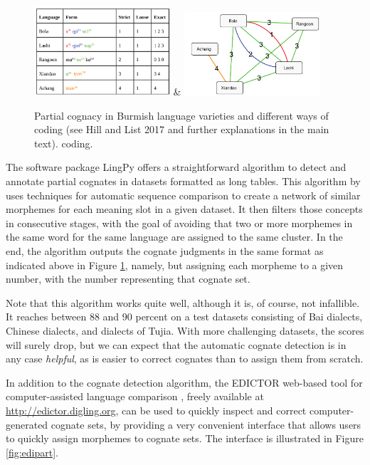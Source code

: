\documentclass[xetex,svgnames]{scrartcl}
\begin{document}
\begin{figure}[htb]
  \centering
  \includegraphics[width=0.45\textwidth]{pcogs-1.png} &
  \includegraphics[width=0.45\textwidth]{pcogs-2.png} \\\endtabular
  \caption{Partial cognacy in Burmish language varieties and different ways of coding (see Hill and
  List 2017 and further explanations in the main text).
  coding.}
  \label{fig:pcogs}
\end{figure}

The software package LingPy offers a straightforward algorithm to detect and annotate partial
cognates in datasets formatted as long tables. This algorithm by \citet{List2016g} uses techniques for automatic sequence
comparison to create a network of similar morphemes for each meaning slot in a given dataset. It
then filters those concepts in consecutive stages, with the goal of avoiding that two or more
morphemes in the same word for the same language are assigned to the same cluster. In the end, the
algorithm outputs the cognate judgments in the same format as indicated above in Figure
\ref{fig:pcogs}, namely, but assigning each morpheme to a given number, with the number representing
that cognate set.

Note that this algorithm works quite well, although it is, of course, not infallible. It reaches
between 88 and 90 percent on a test datasets consisting of Bai dialects, Chinese dialects, and
dialects of Tujia. With more challenging datasets, the scores will surely drop, but we can expect
that the automatic cognate detection is in any case \emph{helpful}, as is easier to correct cognates
than to assign them from scratch.

In addition to the cognate detection algorithm, the EDICTOR web-based tool for computer-assisted
language comparison \citep{List2017d}, freely available at \url{http://edictor.digling.org}, can be
used to quickly inspect and correct computer-generated cognate sets, by providing a very convenient
interface that allows users to quickly assign morphemes to cognate sets. The interface is
illustrated in Figure \ref{fig:edipart}.
\end{document}
